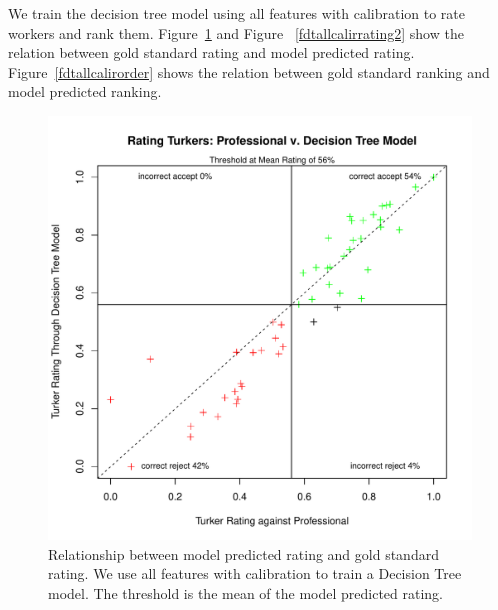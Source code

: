 \documentclass[11pt]{article}
\begin{document}
We train the decision tree model using all features with calibration to rate workers and rank them. Figure~\ref{fdtallcalirrating1} and Figure ~\ref{fdtallcalirrating2} show the relation between gold standard rating and model predicted rating. Figure~\ref{fdtallcalirorder} shows the relation between gold standard ranking and model predicted ranking.

\begin{figure}[htbp]
  \centering
  \includegraphics[width=\linewidth]{AllFeatureWithCali/rrankingallfeaturewithcalidt.pdf}
  \caption{Relationship between model predicted rating and gold standard rating. We use all features with calibration to train a Decision Tree model. The threshold is the mean of the model predicted rating.}
    \label{fdtallcalirrating1}
\end{figure}
\end{document}

